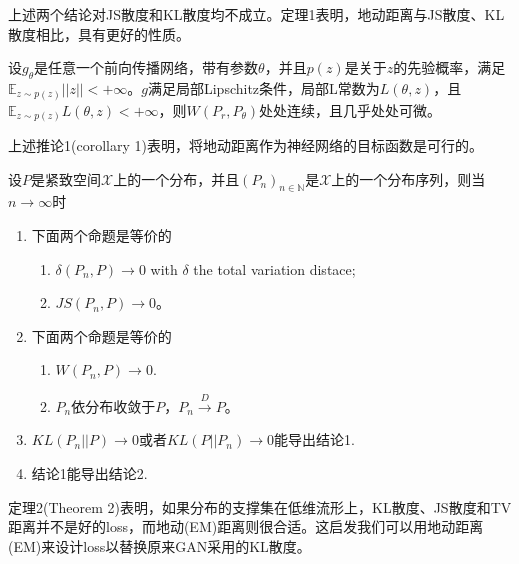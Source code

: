             \par
            上述两个结论对JS散度和KL散度均不成立。定理1表明，地动距离与JS散度、KL散度相比，具有更好的性质。
            \begin{corollary}[corollary 1]
            设$g_\theta$是任意一个前向传播网络，带有参数$\theta$，并且$p(z)$是关于$z$的先验概率，满足$\mathbb{E}_{z\sim p(z)}||z|| < +\infty$。$g$满足局部Lipschitz条件，局部L常数为$L(\theta,z)$，且$\mathbb{E}_{z\sim p(z)}L(\theta,z)<+\infty$，则$W(P_r,P_\theta)$处处连续，且几乎处处可微。
            \end{corollary}
            \par
            上述推论1(corollary 1)表明，将地动距离作为神经网络的目标函数是可行的。
            \begin{theorem}[Theorem 2]
            设$P$是紧致空间$\mathcal{X}$上的一个分布，并且$(P_n)_{n\in \mathbb{N}}$是$\mathcal{X}$上的一个分布序列，则当$n\rightarrow \infty$时
            \begin{enumerate}
            \item 下面两个命题是等价的
            \begin{enumerate}
            \item $\delta(P_n,P)\to 0$ with $\delta$ the total variation distace;
            \item $JS(P_n,P)\to 0$。
            \end{enumerate}
            \item 下面两个命题是等价的
            \begin{enumerate}
            \item $W(P_n,P)\to 0$.
            \item $P_n$依分布收敛于$P$，$P_n\xrightarrow{D} P$。
            \end{enumerate}
            \item $KL(P_n||P)\to 0$或者$KL(P||P_n)\to 0$能导出结论1.
            \item 结论1能导出结论2.
            \end{enumerate}
            \end{theorem}
            \par
            定理2(Theorem 2)表明，如果分布的支撑集在低维流形上，KL散度、JS散度和TV距离并不是好的loss，而地动(EM)距离则很合适。这启发我们可以用地动距离(EM)来设计loss以替换原来GAN采用的KL散度。


